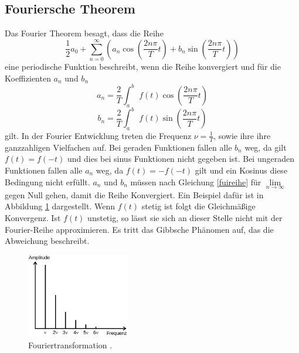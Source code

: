 \subsection{Fouriersche Theorem}
Das Fourier Theorem besagt, dass die Reihe
\begin{equation}
\frac{1}{2}a_0+\sum_{n=0}^\infty\left(a_n \cos\left(\frac{2n\pi}{T}t\right)
+b_n\sin\left(\frac{2n\pi}{T}t\right)\right)
\label{fuireihe}
\end{equation}
eine periodische Funktion beschreibt, wenn die Reihe konvergiert und für die
Koeffizienten $a_n$ und $b_n$
\begin{equation}
  a_n=\frac{2}{T}\int_a^b\,\,f(t)\cos\left(\frac{2n\pi}{T}t\right)
  \label{fuikoeffizient_a}
\end{equation}
\begin{equation}
  b_n=\frac{2}{T}\int_a^b\,\,f(t)\sin\left(\frac{2n\pi}{T}t\right)
  \label{fuikoeffizient_b}
\end{equation}
gilt. In der Fourier Entwicklung treten die Frequenz $\nu=\frac{1}{T}$, sowie ihre
ihre ganzzahligen Vielfachen auf. Bei geraden Funktionen fallen alle $b_n$ weg,
da gilt $f(t)=f(-t)$ und dies bei sinus Funktionen nicht gegeben ist. Bei
ungeraden Funktionen fallen alle $a_n$ weg, da $f(t)=-f(-t)$ gilt und ein Kosinus
diese Bedingung nicht erfüllt. $a_n$ und $b_n$ müssen nach Gleichung
\eqref{fuireihe} für $\lim\limits_{n \to \infty}$ gegen Null gehen, damit die
Reihe Konvergiert. Ein Beispiel dafür ist in Abbildung \ref{fig:Fouriertrafo}
dargestellt. Wenn $f(t)$ stetig ist folgt die Gleichmäßige Konvergenz. Ist $f(t)$
unstetig, so lässt sie sich an dieser Stelle nicht mit der Fourier-Reihe
approximieren. Es tritt das Gibbsche Phänomen auf, das die Abweichung beschreibt.
\begin{figure}
  \centering
  \includegraphics[width=0.4\textwidth]{Fouriertrafo.png}
  \caption{Fouriertransformation \cite{sample}.}
  \label{fig:Fouriertrafo}
\end{figure}
